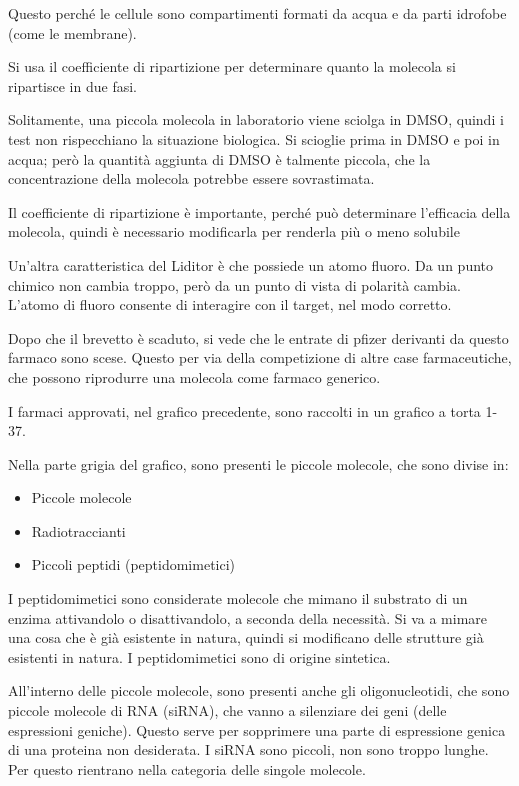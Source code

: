 Questo perché le cellule sono compartimenti formati da acqua e da parti
idrofobe (come le membrane).

Si usa il coefficiente di ripartizione per determinare quanto la
molecola si ripartisce in due fasi.

Solitamente, una piccola molecola in laboratorio viene sciolga in DMSO,
quindi i test non rispecchiano la situazione biologica. Si scioglie
prima in DMSO e poi in acqua; però la quantità aggiunta di DMSO è
talmente piccola, che la concentrazione della molecola potrebbe essere
sovrastimata.

Il coefficiente di ripartizione è importante, perché può determinare
l'efficacia della molecola, quindi è necessario modificarla per renderla
più o meno solubile

Un'altra caratteristica del Liditor è che possiede un atomo fluoro. Da
un punto chimico non cambia troppo, però da un punto di vista di
polarità cambia. L'atomo di fluoro consente di interagire con il target,
nel modo corretto.

Dopo che il brevetto è scaduto, si vede che le entrate di pfizer
derivanti da questo farmaco sono scese. Questo per via della
competizione di altre case farmaceutiche, che possono riprodurre una
molecola come farmaco generico.

I farmaci approvati, nel grafico precedente, sono raccolti in un grafico
a torta 1-37.

Nella parte grigia del grafico, sono presenti le piccole molecole, che
sono divise in:
\begin{itemize}
\item Piccole molecole
\item Radiotraccianti
\item Piccoli peptidi (peptidomimetici)
\end{itemize}

I peptidomimetici sono considerate molecole che mimano il substrato di
un enzima attivandolo o disattivandolo, a seconda della necessità. Si va
a mimare una cosa che è già esistente in natura, quindi si modificano
delle strutture già esistenti in natura.
I peptidomimetici sono di origine sintetica.

All'interno delle piccole molecole, sono presenti anche gli
oligonucleotidi, che sono piccole molecole di RNA (siRNA), che vanno a
silenziare dei geni (delle espressioni geniche).
Questo serve per sopprimere una parte di espressione genica di una
proteina non desiderata.
I siRNA sono piccoli, non sono troppo lunghe. Per questo rientrano nella
categoria delle singole molecole.

